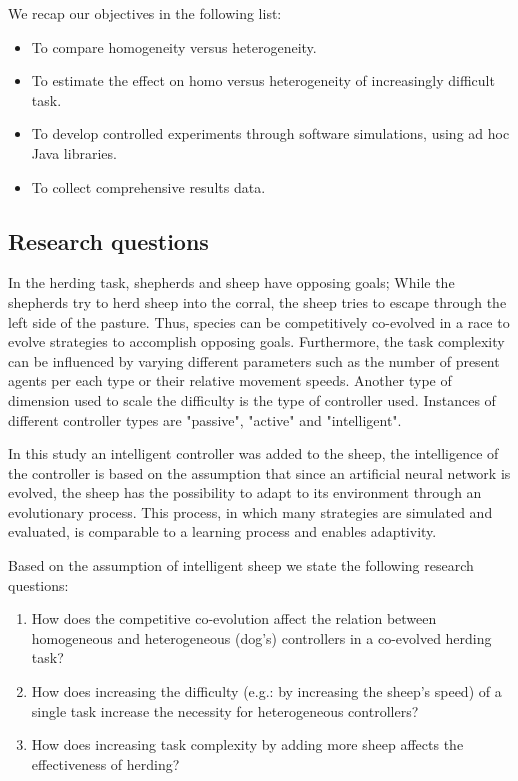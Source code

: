 \documentclass[conference]{IEEEtran}
\begin{document}
We recap our objectives in the following list:

\begin{itemize}
	\item To compare homogeneity versus heterogeneity.
	\item To estimate the effect on homo versus heterogeneity of increasingly difficult task.
 	\item To develop controlled experiments through software simulations, using ad hoc Java libraries.
	\item To collect comprehensive results data.
\end{itemize}
 
\subsection{Research questions}
In the herding task, shepherds and sheep have opposing goals;
While the shepherds try to herd sheep into the corral, the sheep tries to escape through the left side of the pasture.
Thus, species can be competitively co-evolved in a race to evolve strategies to accomplish opposing goals.
Furthermore, the task complexity can be influenced by varying different parameters such as the number of present agents per each type or their relative movement speeds. Another type of dimension used to scale the difficulty is the type of controller used. Instances of different controller types are "passive", "active" and "intelligent". 

In this study an intelligent controller was added to the sheep, the intelligence of the controller is based on the assumption that since an artificial neural network is evolved, the sheep has the possibility to adapt to its environment through an evolutionary process. 
This process, in which many strategies are simulated and evaluated, is comparable to a learning process and enables adaptivity. 

Based on the assumption of intelligent sheep we state the following research questions:
 
\begin{enumerate}
	\item How does the competitive co-evolution affect the relation between homogeneous and heterogeneous (dog’s) controllers in a co-evolved herding task?
	\item How does increasing the difficulty (e.g.: by increasing the sheep’s speed) of a single task increase the necessity for heterogeneous controllers?
	\item How does increasing task complexity by adding more sheep affects the effectiveness of herding?
\end{enumerate}
\end{document}
